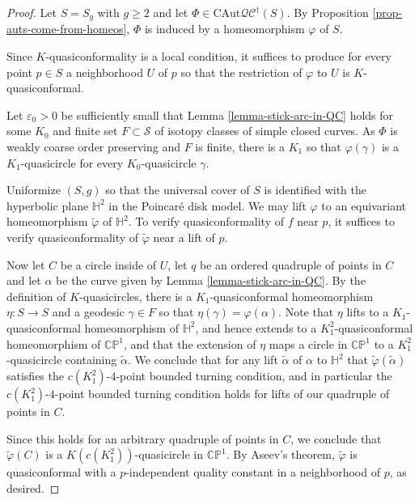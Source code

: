 \documentclass[10pt,a4paper]{amsart}
\newcommand{\CP}{\mathbb{CP}}
\newcommand{\bbH}{\mathbb H}
\begin{document}
\begin{proof}
    Let $S = S_g$ with $g \geq 2$ and let $\Phi\in\mathrm{CAut} \mathcal{QC}^{\dagger}(S)$.
    By Proposition \ref{prop-auts-come-from-homeos}, $\Phi$ is induced by a homeomorphism $\varphi$ of $S$.
    
    Since $K$-quasiconformality is a local condition, it suffices to produce for every point $p \in S$ a neighborhood $U$ of $p$ so that the restriction of $\varphi$ to $U$ is $K$-quasiconformal.

    Let $\varepsilon_0>0$ be sufficiently small that Lemma \ref{lemma-stick-arc-in-QC} holds for some $K_0$ and finite set $F \subset \mathscr{S}$ of isotopy classes of simple closed curves.
    As $\Phi$ is weakly coarse order preserving and $F$ is finite, there is a $K_1$ so that $\varphi(\gamma)$ is a $K_1$-quasicircle for every $K_0$-quasicircle $\gamma$.
    

    Uniformize $(S,g)$ so that the universal cover of $S$ is identified with the hyperbolic plane $\bbH^2$ in the Poincar\'e disk model.
    We may lift $\varphi$ to an equivariant homeomorphism $\widetilde{\varphi}$ of $\bbH^2$.
    To verify quasiconformality of $f$ near $p$, it suffices to verify quasiconformality of $\widetilde{\varphi}$ near a lift of $p$.

    Now let $C$ be a circle inside of $U$, let $q$ be an ordered quadruple of points in $C$ and let $\alpha$ be the curve given by Lemma \ref{lemma-stick-arc-in-QC}. 
    By the definition of $K$-quasicircles, there is a $K_1$-quasiconformal homeomorphism $\eta : S \to S$ and a geodesic $\gamma \in F$ so that $\eta(\gamma) = \varphi(\alpha)$.
    Note that $\eta$ lifts to a $K_1$-quasiconformal homeomorphism of $\bbH^2$, and hence extends to a $K_1^2$-quasiconformal homeomorphism of $\CP^1$, and that the extension of $\eta$ maps a circle in $\CP^1$ to a $K_1^2$-quasicircle containing $\widetilde{\alpha}$.
    We conclude that for any lift $\widetilde{\alpha}$ of $\alpha$ to $\bbH^2$ that $\widetilde{\varphi}(\widetilde{\alpha})$ satisfies the $c(K_1^2)$-$4$-point bounded turning condition, and in particular the $c(K_1^2)$-$4$-point bounded turning condition holds for lifts of our quadruple of points in $C$.
    
    Since this holds for an arbitrary quadruple of points in $C$, we conclude that $\widetilde{\varphi}(C)$ is a $K(c(K_1^2))$-quasicircle in $\CP^1$.
    By Aseev's theorem, $\widetilde{\varphi}$ is quasiconformal with a $p$-independent quality constant in a neighborhood of $p$, as desired.
\end{proof}
\end{document}
